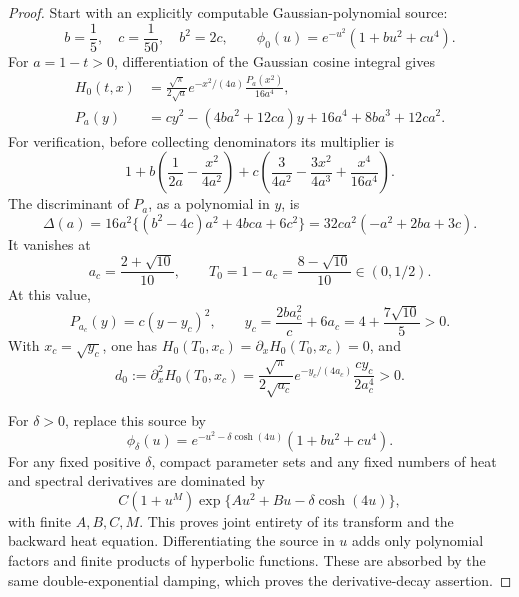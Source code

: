 \documentclass[11pt]{article}
\numberwithin{equation}{section}
\theoremstyle{definition}
\theoremstyle{remark}
\begin{document}
\begin{proof}
Start with an explicitly computable Gaussian-polynomial source:
\[
 b=\frac15,\quad c=\frac1{50},\quad b^2=2c,\qquad
 \phi_0(u)=e^{-u^2}(1+bu^2+cu^4).
\]
For \(a=1-t>0\), differentiation of the Gaussian cosine integral
gives
\begin{align}
 H_0(t,x)&=\frac{\sqrt\pi}{2\sqrt a}e^{-x^2/(4a)}
                           \frac{P_a(x^2)}{16a^4},
 \label{pp:gaussian-control}\\
 P_a(y)&=cy^2-(4ba^2+12ca)y+16a^4+8ba^3+12ca^2.
 \label{pp:gaussian-polynomial}
\end{align}
For verification, before collecting denominators its multiplier is
\[
 1+b\left(\frac1{2a}-\frac{x^2}{4a^2}\right)
   +c\left(\frac3{4a^2}-\frac{3x^2}{4a^3}
                         +\frac{x^4}{16a^4}\right).
\]
The discriminant of \(P_a\), as a polynomial in \(y\), is
\[
 \Delta(a)=16a^2\{(b^2-4c)a^2+4bca+6c^2\}
          =32ca^2(-a^2+2ba+3c).
\]
It vanishes at
\begin{equation}
 a_c=\frac{2+\sqrt{10}}{10},\qquad
 T_0=1-a_c=\frac{8-\sqrt{10}}{10}\in(0,1/2).
 \label{pp:gaussian-time}
\end{equation}
At this value,
\[
 P_{a_c}(y)=c(y-y_c)^2,\qquad
 y_c=\frac{2ba_c^2}{c}+6a_c=4+\frac{7\sqrt{10}}5>0.
\]
With \(x_c=\sqrt{y_c}\), one has
\(H_0(T_0,x_c)=\partial_xH_0(T_0,x_c)=0\), and
\begin{equation}
 d_0:=\partial_x^2H_0(T_0,x_c)
   =\frac{\sqrt\pi}{2\sqrt{a_c}}e^{-y_c/(4a_c)}
                        \frac{c y_c}{2a_c^4}>0.
 \label{pp:gaussian-second-derivative}
\end{equation}

For \(\delta>0\), replace this source by
\begin{equation}
 \phi_\delta(u)=e^{-u^2-\delta\cosh(4u)}(1+bu^2+cu^4).
 \label{pp:damped-source}
\end{equation}
For any fixed positive \(\delta\), compact parameter sets and
any fixed numbers of heat and spectral derivatives are dominated by
\[
 C(1+u^M)\exp\{A u^2+B u-\delta\cosh(4u)\},
\]
with finite \(A,B,C,M\). This proves joint entirety of its transform
and the backward heat equation. Differentiating the source in \(u\)
adds only polynomial factors and finite products of hyperbolic
functions. These are absorbed by the same double-exponential damping,
which proves the derivative-decay assertion.


\end{proof}
\end{document}
